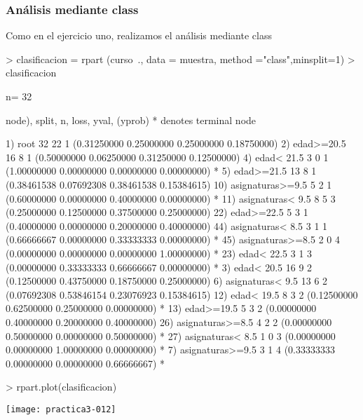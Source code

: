 \documentclass[a4paper]{article}
\begin{document}
\subsubsection{Análisis mediante class}
Como en el ejercicio uno, realizamos el análisis mediante class
\begin{Schunk}
\begin{Sinput}
> clasificacion = rpart (curso~., data = muestra, method ="class",minsplit=1)
> clasificacion
\end{Sinput}
\begin{Soutput}
n= 32 

node), split, n, loss, yval, (yprob)
      * denotes terminal node

 1) root 32 22 1 (0.31250000 0.25000000 0.25000000 0.18750000)  
   2) edad>=20.5 16  8 1 (0.50000000 0.06250000 0.31250000 0.12500000)  
     4) edad< 21.5 3  0 1 (1.00000000 0.00000000 0.00000000 0.00000000) *
     5) edad>=21.5 13  8 1 (0.38461538 0.07692308 0.38461538 0.15384615)  
      10) asignaturas>=9.5 5  2 1 (0.60000000 0.00000000 0.40000000 0.00000000) *
      11) asignaturas< 9.5 8  5 3 (0.25000000 0.12500000 0.37500000 0.25000000)  
        22) edad>=22.5 5  3 1 (0.40000000 0.00000000 0.20000000 0.40000000)  
          44) asignaturas< 8.5 3  1 1 (0.66666667 0.00000000 0.33333333 0.00000000) *
          45) asignaturas>=8.5 2  0 4 (0.00000000 0.00000000 0.00000000 1.00000000) *
        23) edad< 22.5 3  1 3 (0.00000000 0.33333333 0.66666667 0.00000000) *
   3) edad< 20.5 16  9 2 (0.12500000 0.43750000 0.18750000 0.25000000)  
     6) asignaturas< 9.5 13  6 2 (0.07692308 0.53846154 0.23076923 0.15384615)  
      12) edad< 19.5 8  3 2 (0.12500000 0.62500000 0.25000000 0.00000000) *
      13) edad>=19.5 5  3 2 (0.00000000 0.40000000 0.20000000 0.40000000)  
        26) asignaturas>=8.5 4  2 2 (0.00000000 0.50000000 0.00000000 0.50000000) *
        27) asignaturas< 8.5 1  0 3 (0.00000000 0.00000000 1.00000000 0.00000000) *
     7) asignaturas>=9.5 3  1 4 (0.33333333 0.00000000 0.00000000 0.66666667) *
\end{Soutput}
\begin{Sinput}
> rpart.plot(clasificacion)
\end{Sinput}
\end{Schunk}
\texttt{[image: practica3-012]}
\end{document}
